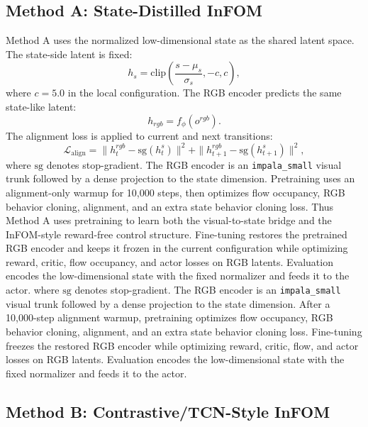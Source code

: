 \documentclass{article}
\begin{document}
\subsection{Method A: State-Distilled InFOM}

Method A uses the normalized low-dimensional state as the shared latent space. The state-side latent is fixed:
\begin{equation}
    h_s = \mathrm{clip}\left(\frac{s-\mu_s}{\sigma_s}, -c, c\right),
\end{equation}
where $c=5.0$ in the local configuration. The RGB encoder predicts the same state-like latent:
\begin{equation}
    h_{rgb} = f_\phi(o^{rgb}).
\end{equation}
The alignment loss is applied to current and next transitions:
\begin{equation}
    \mathcal{L}_{\mathrm{align}} =
    \|h^{rgb}_t - \mathrm{sg}(h^s_t)\|^2
    + \|h^{rgb}_{t+1} - \mathrm{sg}(h^s_{t+1})\|^2,
\end{equation}
where $\mathrm{sg}$ denotes stop-gradient. The RGB encoder is an \texttt{impala\_small} visual trunk followed by a dense projection to the state dimension. Pretraining uses an alignment-only warmup for 10,000 steps, then optimizes flow occupancy, RGB behavior cloning, alignment, and an extra state behavior cloning loss. Thus Method A uses pretraining to learn both the visual-to-state bridge and the InFOM-style reward-free control structure. Fine-tuning restores the pretrained RGB encoder and keeps it frozen in the current configuration while optimizing reward, critic, flow occupancy, and actor losses on RGB latents. Evaluation encodes the low-dimensional state with the fixed normalizer and feeds it to the actor.
where $\mathrm{sg}$ denotes stop-gradient. The RGB encoder is an \texttt{impala\_small} visual trunk followed by a dense projection to the state dimension. After a 10,000-step alignment warmup, pretraining optimizes flow occupancy, RGB behavior cloning, alignment, and an extra state behavior cloning loss. Fine-tuning freezes the restored RGB encoder while optimizing reward, critic, flow, and actor losses on RGB latents. Evaluation encodes the low-dimensional state with the fixed normalizer and feeds it to the actor.

\subsection{Method B: Contrastive/TCN-Style InFOM}
\end{document}
